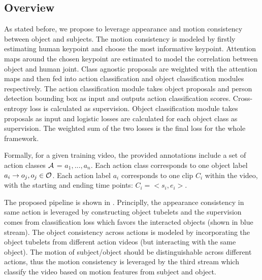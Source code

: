 \subsection{Overview}
As stated before, we propose to leverage appearance and motion consistency between object and subjects. The motion consistency is modeled by firstly estimating human keypoint and choose the most informative keypoint. Attention maps around the chosen keypoint are estimated to model the correlation between object and human joint. Class agnostic proposals are weighted with the attention maps and then fed into action classification and object classification modules respectively. The action classification module takes object proposals and person detection bounding box as input and outputs action classification scores. Cross-entropy loss is calculated as supervision. Object classification module takes proposals as input and logistic losses are calculated for each object class as supervision. The weighted sum of the two losses is the final loss for the whole framework. 

Formally, for a given training video, the provided annotations include a set of action classes ${\mathcal A}$ = {$a_1,...,a_n$}. Each action class corresponds to one object label $a_i\rightarrow o_j, o_j\in {\mathcal O}$. Each action label $a_i$ corresponds to one clip $C_i$ within the video, with the starting and ending time points: $C_i = <s_i, e_i>$.

The proposed pipeline is shown in . Principlly, the appearance consistency in same action is leveraged by constructing object tubelets and the supervision comes from classification loss which favors the interacted objects (shown in blue stream). The object consistency across actions is modeled by incorporating the object tubelets from different action videos (but interacting with the same object). The motion of subject/object should be distinguishable across different actions, thus the motion consistency is leveraged by the third stream which classify the video based on motion features from subject and object. 

